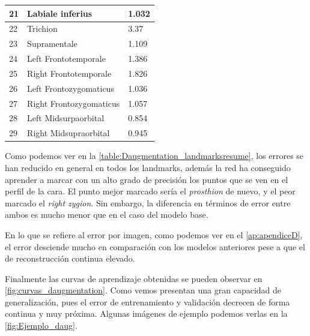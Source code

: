 \begin{table}[!ht]
\begin{tabular}{|l|l|l|}
                21 & Labiale inferius & 1.032 \\ \hline
                22 & Trichion & 3.37 \\ \hline
                23 & Supramentale & 1.109 \\ \hline
                24 & Left Frontotemporale & 1.386 \\ \hline
                25 & Right Frontotemporale & 1.826 \\ \hline
                26 & Left Frontozygomaticus & 1.036 \\ \hline
                27 & Right Frontozygomaticus & 1.057 \\ \hline
                28 & Left Midsurpaorbital & 0.854 \\ \hline
                29 & Right Midsupraorbital & 0.945 \\ \hline
            \end{tabular}
            \label{table:Daugmentation_landmarksresume}
        \end{table}

        \medskip

        \noindent Como podemos ver en la \autoref{table:Daugmentation_landmarksresume}, los errores se han reducido en general en todos los landmarks, además la red ha conseguido aprender a marcar con un alto grado de precisión los puntos que se ven en el perfil de la cara. El punto mejor marcado sería el \textit{prosthion} de nuevo, y el peor marcado el \textit{right zygion}. Sin embargo, la diferencia en términos de error entre ambos es mucho menor que en el caso del modelo base. 

        \medskip

        \noindent En lo que se refiere al error por imagen, como podemos ver en el \autoref{ap:apendiceD}, el error desciende mucho en comparación con los modelos anteriores pese a que el de reconstrucción continua elevado.

        \medskip

        \noindent Finalmente las curvas de aprendizaje obtenidas se pueden observar en \autoref{fig:curvas_daugmentation}. Como vemos presentan una gran capacidad de generalización, pues el error de entrenamiento y validación decrecen de forma continua y muy próxima. Algunas imágenes de ejemplo podemos verlas en la \autoref{fig:Ejemplo_daug}.

